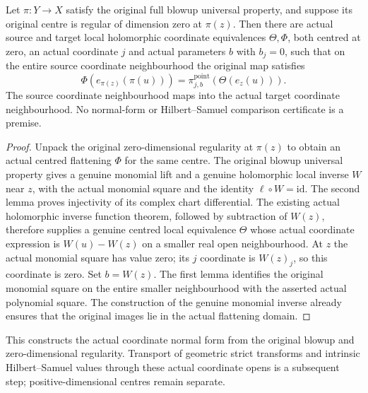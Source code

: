 \begin{theorem}
\label{hir:actual-point-centre-blowup-coordinate-normal-form}
\leanok
Let $\pi:Y\to X$ satisfy the original full blowup universal property,
and suppose its original centre is regular of dimension zero at
$\pi(z)$. Then there are actual source and target local holomorphic
coordinate equivalences $\Theta,\Phi$, both centred at zero, an actual
coordinate $j$ and actual parameters $b$ with $b_j=0$, such that on the
entire source coordinate neighbourhood the original map satisfies
\[
 \Phi(e_{\pi(z)}(\pi(u)))
 =\pi^{\mathrm{point}}_{j,b}(\Theta(e_z(u))).
\]
The source coordinate neighbourhood maps into the actual target
coordinate neighbourhood. No normal-form or Hilbert--Samuel comparison
certificate is a premise.
\end{theorem}
\begin{proof}
Unpack the original zero-dimensional regularity at $\pi(z)$ to obtain
an actual centred flattening $\Phi$ for the same centre. The original
blowup universal property gives a genuine monomial lift and a genuine
holomorphic local inverse $W$ near $z$, with the actual monomial square
and the identity $\ell\circ W=\mathrm{id}$. The second lemma proves
injectivity of its complex chart differential. The existing actual
holomorphic inverse function theorem, followed by subtraction of $W(z)$,
therefore supplies a genuine centred local equivalence $\Theta$ whose
actual coordinate expression is $W(u)-W(z)$ on a smaller real open
neighbourhood. At $z$ the actual monomial square has value zero; its
$j$ coordinate is $W(z)_j$, so this coordinate is zero. Set $b=W(z)$.
The first lemma identifies the original monomial square on the entire
smaller neighbourhood with the asserted actual polynomial square.
The construction of the genuine monomial inverse already ensures that
the original images lie in the actual flattening domain.
\end{proof}

This constructs the actual coordinate normal form from the original
blowup and zero-dimensional regularity. Transport of geometric strict
transforms and intrinsic Hilbert--Samuel values through these actual
coordinate opens is a subsequent step; positive-dimensional centres
remain separate.
